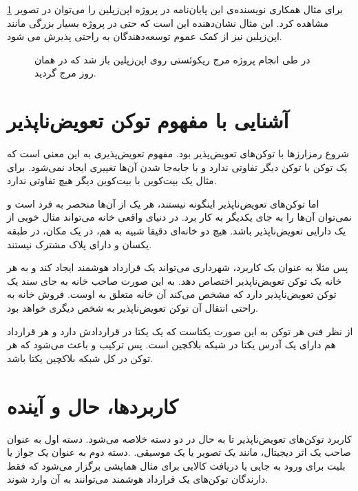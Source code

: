 برای مثال همکاری
نویسنده‌ی این پایان‌نامه در پروژه اپن‌زپلین را می‌توان در تصویر
\ref{fig:zeppelin-merge-req}
مشاهده کرد.
این مثال نشان‌دهنده این است که حتی در پروژه بسیار بزرگی مانند اپن‌زپلین نیز
از کمک عموم توسعه‌دهندگان به راحتی پذیرش می شود.

\begin{figure}[H]
\centerline{}
\caption{در طی انجام پروژه مرج ریکوئستی روی اپن‌زپلین باز شد که در همان روز مرج گردید.}
\label{fig:zeppelin-merge-req}
\end{figure}


\section{آشنایی با مفهوم توکن تعویض‌ناپذیر}
شروع رمزارزها با توکن‌های تعویض‌پذیر بود.
مفهوم تعویض‌پذیری به این معنی است که یک توکن با توکن دیگر تفاوتی ندارد
و با جابه‌جا شدن آن‌ها تغییری ایجاد نمی‌شود.
برای مثال یک بیت‌کوین با بیت‌کوین دیگر هیچ تفاوتی ندارد.

اما توکن‌های تعویض‌ناپذیر اینگونه نیستند،
هر یک از آن‌ها منحصر به فرد است و نمی‌توان آن‌ها را به جای یکدیگر به کار برد.
در دنیای واقعی خانه می‌تواند مثال خوبی از یک دارایی تعویض‌ناپذیر باشد.
هیچ دو خانه‌ای دقیقا شبیه به هم، در یک مکان، در طبقه یکسان و دارای پلاک مشترک نیستند.

پس مثلا به عنوان یک کاربرد،
شهرداری می‌تواند یک قرارداد هوشمند ایجاد کند
و به هر خانه یک توکن تعویض‌ناپذیر اختصاص دهد.
به این صورت صاحب خانه به جای سند یک توکن تعویض‌ناپذیر دارد
که مشخص می‌کند آن خانه متعلق به اوست.
فروش خانه به راحتی انتقال آن توکن تعویض‌ناپذیر به شخص دیگری خواهد بود.

از نظر فنی هر توکن به این صورت یکتاست که یک
یکتا در قراردادش دارد و هر قرارداد هم دارای یک آدرس یکتا در شبکه بلاکچین است. پس ترکیب
و
باعث می‌شود که هر توکن در کل شبکه بلاکچین یکتا باشد.


\section{کاربردها، حال و آینده}
کاربرد توکن‌های تعویض‌ناپذیر تا به حال در دو دسته خلاصه می‌شود.
دسته اول به عنوان صاحب یک اثر دیجیتال،
مانند یک تصویر یا یک موسیقی.
.دسته دوم به عنوان یک جواز یا بلیت برای ورود به جایی یا دریافت کالایی
برای مثال همایشی برگزار می‌شود که فقط دارندگان توکن‌های یک قرارداد هوشمند می‌توانند به آن وارد شوند.

